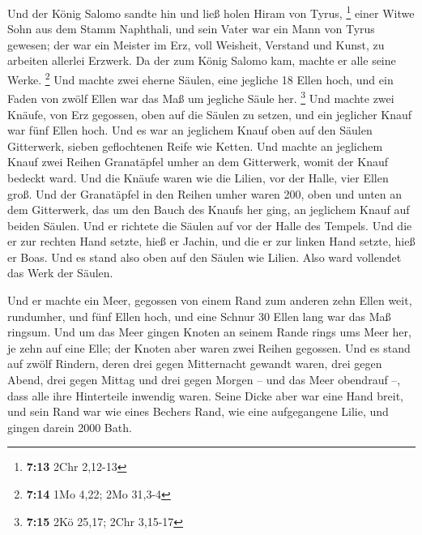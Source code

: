  Und der König Salomo sandte hin und ließ holen Hiram von
Tyrus, \footnote{\textbf{7:13} 2Chr 2,12-13}  einer Witwe
Sohn aus dem Stamm Naphthali, und sein Vater war ein Mann von Tyrus
gewesen; der war ein Meister im Erz, voll Weisheit, Verstand und Kunst,
zu arbeiten allerlei Erzwerk. Da der zum König Salomo kam, machte er
alle seine Werke. \footnote{\textbf{7:14} 1Mo 4,22; 2Mo 31,3-4}
 Und machte zwei eherne Säulen, eine jegliche 18 Ellen
hoch, und ein Faden von zwölf Ellen war das Maß um jegliche Säule her.
\footnote{\textbf{7:15} 2Kö 25,17; 2Chr 3,15-17}  Und
machte zwei Knäufe, von Erz gegossen, oben auf die Säulen zu setzen, und
ein jeglicher Knauf war fünf Ellen hoch.  Und es war an
jeglichem Knauf oben auf den Säulen Gitterwerk, sieben geflochtenen
Reife wie Ketten.  Und machte an jeglichem Knauf zwei
Reihen Granatäpfel umher an dem Gitterwerk, womit der Knauf bedeckt
ward.  Und die Knäufe waren wie die Lilien, vor der
Halle, vier Ellen groß.  Und der Granatäpfel in den
Reihen umher waren 200, oben und unten an dem Gitterwerk, das um den
Bauch des Knaufs her ging, an jeglichem Knauf auf beiden Säulen.
 Und er richtete die Säulen auf vor der Halle des
Tempels. Und die er zur rechten Hand setzte, hieß er Jachin, und die er
zur linken Hand setzte, hieß er Boas.  Und es stand also
oben auf den Säulen wie Lilien. Also ward vollendet das Werk der Säulen.

 Und er machte ein Meer, gegossen von einem Rand zum
anderen zehn Ellen weit, rundumher, und fünf Ellen hoch, und eine Schnur
30 Ellen lang war das Maß ringsum.  Und um das Meer
gingen Knoten an seinem Rande rings ums Meer her, je zehn auf eine Elle;
der Knoten aber waren zwei Reihen gegossen.  Und es stand
auf zwölf Rindern, deren drei gegen Mitternacht gewandt waren, drei
gegen Abend, drei gegen Mittag und drei gegen Morgen -- und das Meer
obendrauf --, dass alle ihre Hinterteile inwendig waren. 
Seine Dicke aber war eine Hand breit, und sein Rand war wie eines
Bechers Rand, wie eine aufgegangene Lilie, und gingen darein 2000 Bath.

